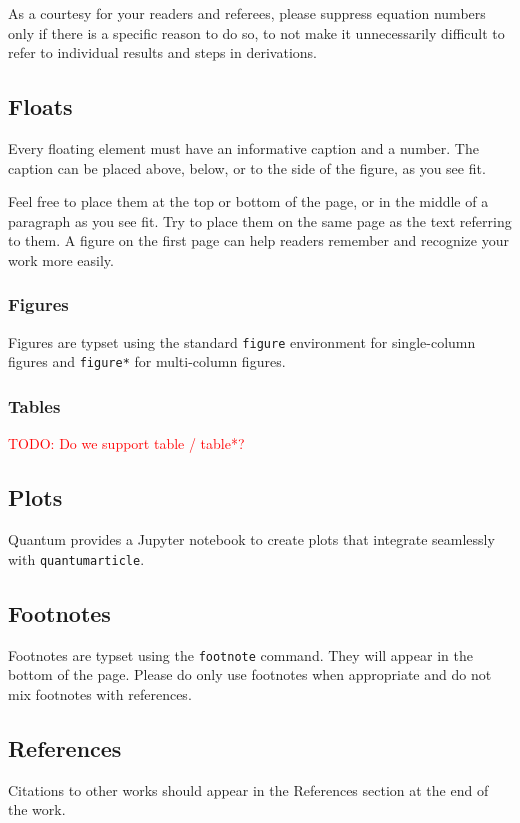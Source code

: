 \documentclass[a4paper,noarxiv,onecolumn]{quantumarticle}
\newcommand{\todo}[1]{\textcolor{red}{TODO: #1}}
\begin{document}
	As a courtesy for your readers and referees, please suppress equation numbers only if there is a specific reason to do so, to not make it unnecessarily difficult to refer to individual results and steps in derivations.
	
	\subsection{Floats}	
	Every floating element must have an informative caption and a number. The caption can be placed above, below, or to the side of the figure, as you see fit.
	
	Feel free to place them at the top or bottom of the page, or in the middle of a paragraph as you see fit. Try to place them on the same page as the text referring to them. A figure on the first page can help readers remember and recognize your work more easily.
	
	\subsubsection{Figures}
	Figures are typset using the standard \texttt{figure} environment for single-column figures and \texttt{figure*} for multi-column figures. 
	
	\subsubsection{Tables}
	\todo{Do we support table / table*?}
	
	\subsection{Plots}
	Quantum provides a Jupyter notebook to create plots that integrate seamlessly with \texttt{quantumarticle}.
	
	\subsection{Footnotes}
	Footnotes are typset using the \texttt{footnote} command. They will appear in the bottom of the page. Please do only use footnotes when appropriate and do not mix footnotes with references.
	
	\subsection{References}	
	Citations to other works should appear in the References section at the end of the work.
	
\end{document}
